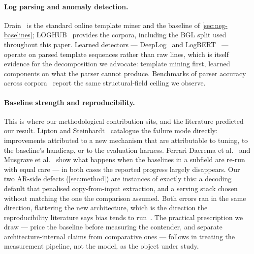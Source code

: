 \paragraph{Log parsing and anomaly detection.} Drain~\cite{he2017drain} is the
standard online template miner and the baseline of \cref{sec:neg-baselines};
LOGHUB~\cite{he2020loghub} provides the corpora, including the BGL split used
throughout this paper. Learned detectors --- DeepLog~\cite{du2017deeplog} and
LogBERT~\cite{guo2021logbert} --- operate on parsed template sequences rather
than raw lines, which is itself evidence for the decomposition we advocate:
template mining first, learned components on what the parser cannot produce.
Benchmarks of parser accuracy across corpora~\cite{zhu2019toolsandbenchmarks}
report the same structural-field ceiling we observe.

\paragraph{Baseline strength and reproducibility.} This is where our
methodological contribution sits, and the literature predicted our result.
Lipton and Steinhardt~\cite{lipton2019troubling} catalogue the failure mode
directly: improvements attributed to a new mechanism that are attributable to
tuning, to the baseline's handicap, or to the evaluation harness. Ferrari Dacrema
et al.~\cite{dacrema2019worrying} and Musgrave et al.~\cite{musgrave2020reality}
show what happens when the baselines in a subfield are re-run with equal care ---
in both cases the reported progress largely disappears. Our two AR-side defects
(\cref{sec:method}) are instances of exactly this: a decoding default that
penalised copy-from-input extraction, and a serving stack chosen without matching
the one the comparison assumed. Both errors ran in the same direction, flattering
the new architecture, which is the direction the reproducibility literature says
bias tends to run~\cite{sculley2018winners}. The practical prescription we draw
--- price the baseline before measuring the contender, and separate
architecture-internal claims from comparative ones --- follows
\cite{bouthillier2019unreproducible} in treating the measurement pipeline, not
the model, as the object under study. 
